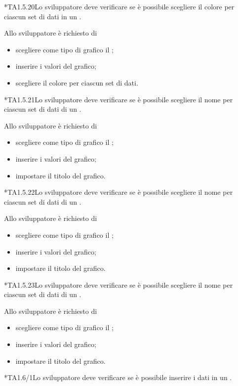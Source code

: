 	*{TA1.5.20}Lo sviluppatore deve verificare se è possibile scegliere il colore per ciascun set di dati in un .

		Allo sviluppatore è richiesto di
		\begin{itemize}
			\item scegliere come tipo di grafico il ;
			\item inserire i valori del grafico;
			\item scegliere il colore per ciascun set di dati.
		\end{itemize}

	*{TA1.5.21}Lo sviluppatore deve verificare se è possibile scegliere il nome per ciascun set di dati di un .

		Allo sviluppatore è richiesto di
		\begin{itemize}
			\item scegliere come tipo di grafico il ;
			\item inserire i valori del grafico;
			\item impostare il titolo del grafico.
		\end{itemize}

	*{TA1.5.22}Lo sviluppatore deve verificare se è possibile scegliere il nome per ciascun set di dati di un .

		Allo sviluppatore è richiesto di
		\begin{itemize}
			\item scegliere come tipo di grafico il ;
			\item inserire i valori del grafico;
			\item impostare il titolo del grafico.
		\end{itemize}

	*{TA1.5.23}Lo sviluppatore deve verificare se è possibile scegliere il nome per ciascun set di dati di un .

		Allo sviluppatore è richiesto di
		\begin{itemize}
			\item scegliere come tipo di grafico il ;
			\item inserire i valori del grafico;
			\item impostare il titolo del grafico.
		\end{itemize}

	*{TA1.6/1}Lo sviluppatore deve verificare se è possibile inserire i dati in un .

